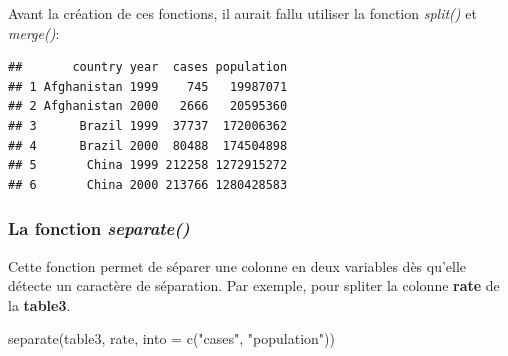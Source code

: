 \documentclass[
]{book}
\newenvironment{Shaded}{\begin{snugshade}}{\end{snugshade}}
\newcommand{\AttributeTok}[1]{\textcolor[rgb]{0.77,0.63,0.00}{#1}}
\newcommand{\DecValTok}[1]{\textcolor[rgb]{0.00,0.00,0.81}{#1}}
\newcommand{\FunctionTok}[1]{\textcolor[rgb]{0.00,0.00,0.00}{#1}}
\newcommand{\NormalTok}[1]{#1}
\newcommand{\OtherTok}[1]{\textcolor[rgb]{0.56,0.35,0.01}{#1}}
\newcommand{\SpecialCharTok}[1]{\textcolor[rgb]{0.00,0.00,0.00}{#1}}
\newcommand{\StringTok}[1]{\textcolor[rgb]{0.31,0.60,0.02}{#1}}
\theoremstyle{definition}
\theoremstyle{definition}
\theoremstyle{definition}
\theoremstyle{definition}
\theoremstyle{remark}
\begin{document}
Avant la création de ces fonctions, il aurait fallu utiliser la fonction \emph{split()} et \emph{merge()}:

\begin{Shaded}
\end{Shaded}

\begin{verbatim}
##       country year  cases population
## 1 Afghanistan 1999    745   19987071
## 2 Afghanistan 2000   2666   20595360
## 3      Brazil 1999  37737  172006362
## 4      Brazil 2000  80488  174504898
## 5       China 1999 212258 1272915272
## 6       China 2000 213766 1280428583
\end{verbatim}

\hypertarget{la-fonction-separate}{%
\subsubsection{\texorpdfstring{La fonction \emph{separate()}}{La fonction separate()}}\label{la-fonction-separate}}

Cette fonction permet de séparer une colonne en deux variables dès qu'elle détecte un caractère de séparation. Par exemple, pour spliter la colonne \textbf{rate} de la \textbf{table3}.

\begin{Shaded}
\begin{Highlighting}[]
\FunctionTok{separate}\NormalTok{(table3, rate, }\AttributeTok{into =} \FunctionTok{c}\NormalTok{(}\StringTok{"cases"}\NormalTok{, }\StringTok{"population"}\NormalTok{))}
\end{Highlighting}
\end{Shaded}
\end{document}
